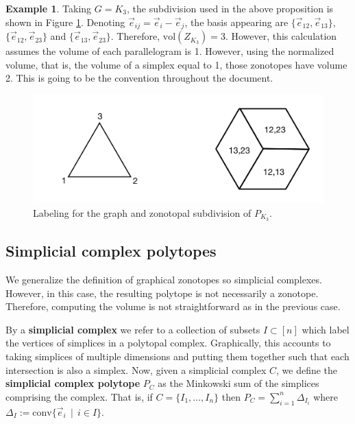 \documentclass[english,11pt]{article}
\theoremstyle{definition}
\theoremstyle{definition}
\theoremstyle{definition}
\newtheorem{example}{Example}[section]
\theoremstyle{remark}
\theoremstyle{definition}
\begin{document}
\begin{example}
Taking $G=K_3$, the subdivision used in the above proposition is shown in Figure \ref{fig:zon-sub-K3}. Denoting $\vec{e}_{ij} = \vec{e}_i-\vec{e}_j$, the basis appearing are $\{\vec{e}_{12},\vec{e}_{13}\}$, $\{\vec{e}_{12},\vec{e}_{23}\}$ and $\{\vec{e}_{13},\vec{e}_{23}\}$. Therefore, $\text{vol}(Z_{K_3}) = 3$. However, this calculation assumes the volume of each parallelogram is 1. However, using the normalized volume, that is, the volume of a simplex equal to 1, those zonotopes have volume 2. This is going to be the convention throughout the document. 

\begin{figure}[!]
    \centering
    \includegraphics[scale=0.12]{images/ZonSubK3.png}
    \caption{Labeling for the graph and zonotopal subdivision of $P_{K_3}$. }
    \label{fig:zon-sub-K3}
\end{figure}
\end{example}

\subsection{Simplicial complex polytopes}

We generalize the definition of graphical zonotopes so simplicial complexes. However, in this case, the resulting polytope is not necessarily a zonotope. Therefore, computing the volume is not straightforward as in the previous case. 

By a \textbf{simplicial complex} we refer to a collection of subsets $I\subset [n]$ which label the vertices of simplices in a polytopal complex. Graphically, this accounts to taking simplices of multiple dimensions and putting them together such that each intersection is also a simplex. Now, given a simplicial complex $C$, we define the \textbf{simplicial complex polytope} $P_C$ as the Minkowski sum of the simplices comprising the complex. That is, if $C = \{ I_1,\ldots,I_n\}$ then $P_C = \sum_{i=1}^n \Delta_{I_i}$ where $\Delta_I := \text{conv}\{ \Vec{e}_i \, \mid \, i\in I \}$. 
\end{document}
